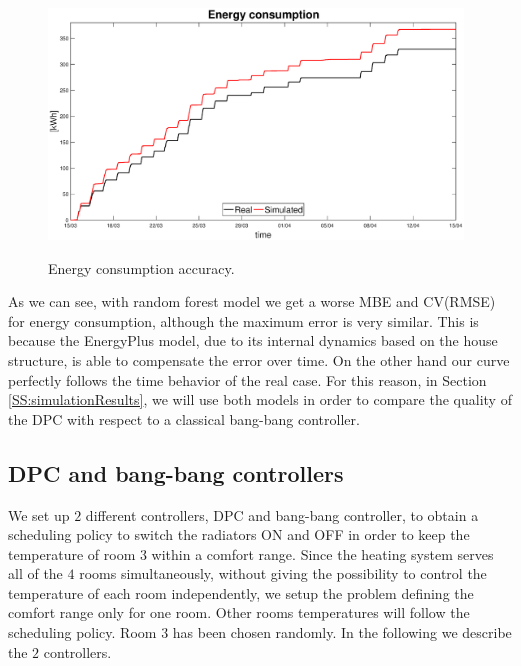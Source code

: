 \begin{figure}[h!]
	\begin{center}
		\includegraphics[width=26pc]{figures/Energy_test.eps}
		\caption{Energy consumption accuracy.}
		\captionsetup{justification=centering}
		\label{F:Energy_testing}
	\end{center}
\end{figure}

As we can see, with random forest model we get a worse MBE and CV(RMSE) for energy consumption, although the maximum error is very similar. This is because the EnergyPlus model, due to its internal dynamics based on the house structure, is able to compensate the error over time. On the other hand our curve perfectly follows the time behavior of the real case. For this reason, in Section \ref{SS:simulationResults}, we will use both models in order to compare the quality of the DPC with respect to a classical bang-bang controller.

\subsection{DPC and bang-bang controllers} We set up $2$ different controllers, DPC and bang-bang controller, to obtain a scheduling policy to switch the radiators ON and OFF in order to keep the temperature of room $3$ within a comfort range. Since the heating system serves all of the $4$ rooms simultaneously, without giving the possibility to control the temperature of each room independently, we setup the problem defining the comfort range only for one room. Other rooms temperatures will follow the scheduling policy. Room $3$ has been chosen randomly. In the following we describe the $2$ controllers.

